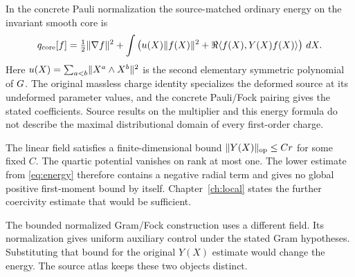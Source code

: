 In the concrete Pauli normalization the source-matched ordinary energy on the invariant smooth core is
\begin{equation}
 q_{\rm core}[f]=\tfrac12\lVert \nabla f\rVert^2+
       \int \left(u(X)\lVert f(X)\rVert^2+
       \Re\langle f(X),Y(X)f(X)\rangle\right)\,dX .
 \label{eq:energy}
\end{equation}
Here $u(X)=\sum_{a<b}\lVert X^a\wedge X^b\rVert^2$ is the second elementary symmetric polynomial of $G$. The original massless charge identity specializes the deformed source at its undeformed parameter values, and the concrete Pauli/Fock pairing gives the stated coefficients. Source results on the multiplier and this energy formula do not describe the maximal distributional domain of every first-order charge.

The linear field satisfies a finite-dimensional bound $\lVert Y(X)\rVert_{\mathrm{op}}\le C r$ for some fixed $C$. The quartic potential vanishes on rank at most one. The lower estimate from \eqref{eq:energy} therefore contains a negative radial term and gives no global positive first-moment bound by itself. Chapter~\ref{ch:local} states the further coercivity estimate that would be sufficient.

The bounded normalized Gram/Fock construction uses a different field. Its normalization gives uniform auxiliary control under the stated Gram hypotheses. Substituting that bound for the original $Y(X)$ estimate would change the energy. The source atlas keeps these two objects distinct.
